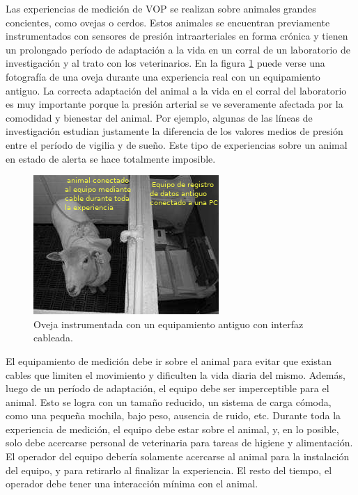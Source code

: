 Las experiencias de medición de VOP se realizan sobre animales grandes concientes, como ovejas o cerdos. Estos animales se encuentran previamente instrumentados con sensores de presión intraarteriales en forma crónica y tienen un prolongado período de adaptación a la vida en un corral de un laboratorio de investigación y al trato con los veterinarios. En la figura \ref{fig:oveja} puede verse una fotografía de una oveja durante una experiencia real con un equipamiento antiguo. La correcta adaptación del animal a la vida en el corral del laboratorio es muy importante porque la presión arterial se ve severamente afectada por la comodidad y bienestar del animal. Por ejemplo, algunas de las líneas de investigación estudian justamente la diferencia de los valores medios de presión entre el período de vigilia y de sueño. Este tipo de experiencias sobre un animal en estado de alerta se hace totalmente imposible.


\begin{figure}[!htbp]
	\centering
	
	\begin{minipage}{0.65\textwidth}
		\includegraphics[width=\textwidth]{./Figures/oveja.png}		
	\end{minipage}		
	
	\caption{Oveja instrumentada con un equipamiento antiguo con interfaz cableada.}
	\label{fig:oveja}
\end{figure}

El equipamiento de medición debe ir sobre el animal para evitar que existan cables que limiten el movimiento y dificulten la vida diaria del mismo. Además, luego de un período de adaptación, el equipo debe ser imperceptible para el animal. Esto se logra con un tamaño reducido, un sistema de carga cómoda, como una pequeña mochila, bajo peso, ausencia de ruido, etc. Durante toda la experiencia de medición, el equipo debe estar sobre el animal, y, en lo posible, solo debe acercarse personal de veterinaria para tareas de higiene y alimentación. El operador del equipo debería solamente acercarse al animal para la instalación del equipo, y para retirarlo al finalizar la experiencia. El resto del tiempo, el operador debe tener una interacción mínima con el animal.


